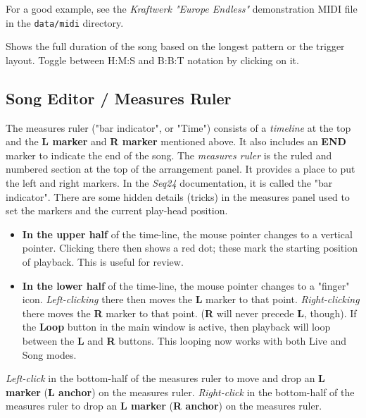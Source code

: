    For a good example, see the \textsl{Kraftwerk "Europe Endless"}
   demonstration MIDI file in the \texttt{data/midi} directory.

   Shows the full duration of the song based on the longest pattern or
   the trigger layout.
   Toggle between H:M:S and B:B:T notation by clicking on it.

\subsection{Song Editor / Measures Ruler}
\label{subsec:song_editor_measures_ruler}

   The measures ruler ("bar indicator", or "Time")
   consists of a \textsl{timeline} at the top and the 
   \textbf{L marker} and \textbf{R marker} mentioned above.
   It also includes an \textbf{END} marker to indicate the
   end of the song.
   The \textsl{measures ruler} is the ruled and numbered section at the top
   of the arrangement panel.  It provides a place to put the left and right
   markers.  In the \textsl{Seq24} documentation, it is called the "bar
   indicator".
   There are some hidden details (tricks) in the measures panel used to
   set the markers and the current play-head position.

   \begin{itemize}
      \item \textbf{In the upper half} of the time-line,
         the mouse pointer changes to a vertical pointer.
         Clicking there then shows a red dot; these mark
         the starting position of playback.
         This is useful for review.
      \item \textbf{In the lower half} of the time-line,
         the mouse pointer changes to a "finger" icon.
         \textsl{Left-clicking} there then moves the \textbf{L}
         marker to that point.
         \textsl{Right-clicking} there moves the \textbf{R} marker to that point.
         (\textbf{R} will never precede \textbf{L}, though).
         If the \textbf{Loop} button in the main window is active, then
         playback will loop between the \textbf{L} and \textbf{R} buttons.
         This looping now works with both Live and Song modes.
   \end{itemize}

   \textsl{Left-click} in the bottom-half of the
   measures ruler to move and drop an
   \textbf{L marker} (\textbf{L anchor}) on the measures ruler.
   \textsl{Right-click} in the bottom-half of the measures ruler to drop an
   \textbf{L marker} (\textbf{R anchor}) on the measures ruler.
   
